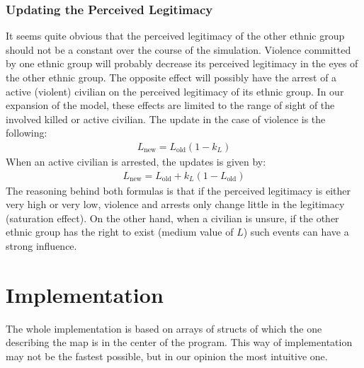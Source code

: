 \documentclass[11pt]{article}
\begin{document}
\subsubsection{Updating the Perceived Legitimacy}
It seems quite obvious that the perceived legitimacy of the other ethnic group should not be a constant over the course of the simulation. Violence committed by one ethnic group will probably decrease its perceived legitimacy in the eyes of the other ethnic group. The opposite effect will possibly have the arrest of a active (violent) civilian on the perceived legitimacy of its ethnic group. In our expansion of the model, these effects are limited to the range of sight of the involved killed or active civilian. The update in the case of violence is the following:
\begin{align}
L_{\text{new}} = L_{\text{old}} \left( 1 - k_L \right)
\end{align}
When an active civilian is arrested, the updates is given by:
\begin{align}
L_{\text{new}} = L_{\text{old}} + k_L \left( 1 - L_{\text{old}} \right)
\end{align}
The reasoning behind both formulas is that if the perceived legitimacy is either very high or very low, violence and arrests only change little in the legitimacy (saturation effect). On the other hand, when a civilian is unsure, if the other ethnic group has the right to exist (medium value of $L$) such events can have a strong influence.

\section{Implementation}
The whole implementation is based on arrays of structs of which the one describing the map is in the center of the program. This way of implementation may not be the fastest possible, but in our opinion the most intuitive one.
\end{document}
